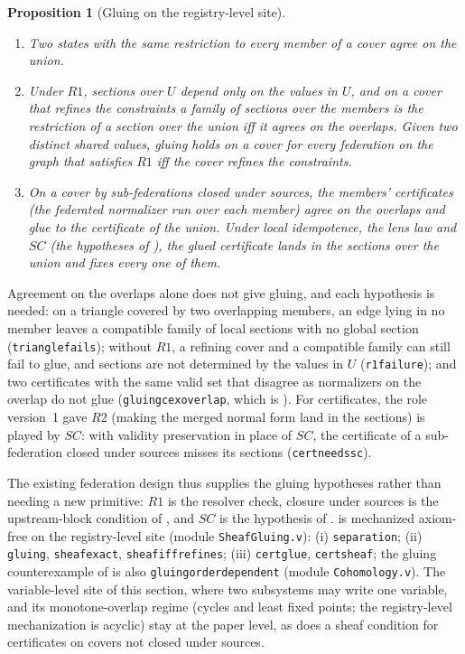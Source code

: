 \documentclass[11pt,a4paper]{article}
\theoremstyle{plain}
\newtheorem{proposition}[theorem]{Proposition}
\theoremstyle{definition}
\theoremstyle{remark}
\renewcommand{\_}{\origunderscore\allowbreak}
\begin{document}
\begin{proposition}[Gluing on the registry-level site]
\label{prop:gluing}
\begin{enumerate}[label=(\roman*)]
\item Two states with the same restriction to every member of a cover agree on the union.
\item Under $R1$, sections over $U$ depend only on the values in $U$, and on a cover that refines the
  constraints a family of sections over the members is the restriction of a section over the union
  iff it agrees on the overlaps. Given two distinct shared values, gluing holds on a cover for every
  federation on the graph that satisfies $R1$ iff the cover refines the constraints.
\item On a cover by sub-federations closed under sources, the members' certificates (the federated
  normalizer run over each member) agree on the overlaps and glue to the certificate of the union.
  Under local idempotence, the lens law and $SC$ (the hypotheses of ), the glued
  certificate lands in the sections over the union and fixes every one of them.
\end{enumerate}
\end{proposition}

Agreement on the overlaps alone does not give gluing, and each hypothesis is needed: on a triangle
covered by two overlapping members, an edge lying in no member leaves a compatible family of local
sections with no global section (\texttt{triangle\_fails}); without $R1$, a refining cover and a
compatible family can still fail to glue, and sections are not determined by the values in $U$
(\texttt{r1\_failure}); and two certificates with the same valid set that disagree as normalizers on
the overlap do not glue (\texttt{gluing\_cex\_overlap}, which is ). For certificates,
the role version~1 gave $R2$ (making the merged normal form land in the sections) is played by $SC$:
with validity preservation in place of $SC$, the certificate of a sub-federation closed under sources
misses its sections (\texttt{cert\_needs\_sc}).

The existing federation design thus supplies the gluing hypotheses rather than needing a new
primitive: $R1$ is the resolver check, closure under sources is the upstream-block condition of
, and $SC$ is the hypothesis of .  is mechanized
axiom-free on the registry-level site (module \texttt{SheafGluing.v}):
(i) \texttt{separation}; (ii) \texttt{gluing}, \texttt{sheaf\_exact}, \texttt{sheaf\_iff\_refines};
(iii) \texttt{cert\_glue}, \texttt{cert\_sheaf}; the gluing counterexample of  is also
\texttt{gluing\_order\_dependent} (module \texttt{Cohomology.v}). The variable-level site of this
section, where two subsystems may write one variable, and its monotone-overlap regime (cycles and
least fixed points; the registry-level mechanization is acyclic) stay at the paper level, as does a
sheaf condition for certificates on covers not closed under sources.
\end{document}
